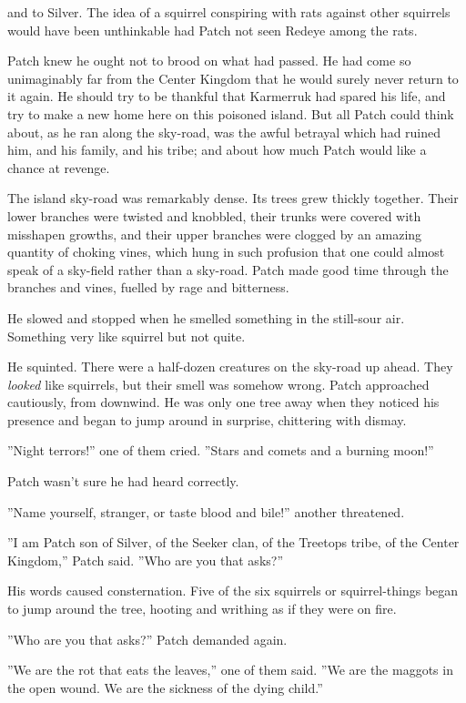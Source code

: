 \documentclass[11pt]{article}
\begin{document}
 and to Silver. The idea of a squirrel conspiring with rats against other squirrels would have been unthinkable %
 had Patch not seen Redeye among the rats.\par
Patch knew he ought not to brood on what had passed. He had come so unimaginably far from the Center Kingdom that he would surely never return to it again. He should try to be thankful that Karmerruk had spared his life, and try to make a new home here on this poisoned island. But all Patch could think about, as he ran along the sky-road, was the awful betrayal which had ruined him, and his family, and his tribe; and about how much Patch would like a chance at revenge.\par
The island sky-road was remarkably dense. Its trees grew thickly together. Their lower branches were twisted and knobbled, their trunks were covered with misshapen growths, and their upper branches were clogged by an amazing quantity of choking vines, which hung in such profusion that one could almost speak of a sky-field rather than a sky-road. Patch made good time through the branches and vines, fuelled by rage and bitterness.\par
He slowed and stopped when he smelled something in the still-sour air. Something very like squirrel%
but not quite.\par
He squinted. There were a half-dozen creatures on the sky-road up ahead. They {\it looked} like squirrels, but their smell was somehow wrong. Patch approached cautiously, from downwind. He was only one tree away when they noticed his presence and began to jump around in surprise, chittering with dismay.\par
''Night terrors!'' one of them cried. ''Stars and comets and a burning moon!''\par
Patch wasn't sure he had heard correctly.\par
''Name yourself, stranger, or taste blood and bile!'' another threatened.\par
 ''I am Patch son of Silver, of the Seeker clan, of the Treetops tribe, of the Center Kingdom,'' Patch said. ''Who are you that asks?''\par
His words caused consternation. Five of the six squirrels %
 or squirrel-things %
 began to jump around the tree, hooting and writhing as if they were on fire.\par
''Who are you that asks?'' Patch demanded again.\par
''We are the rot that eats the leaves,'' one of them said. ''We are the maggots in the open wound. We are the sickness of the dying child.''\par
\end{document}
